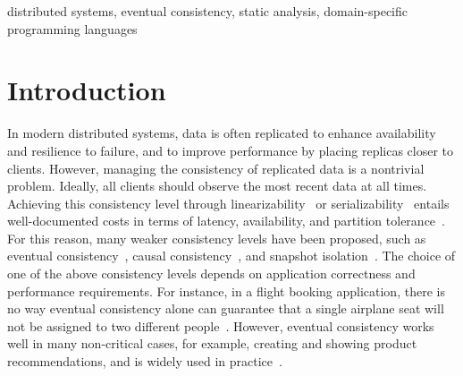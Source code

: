 \documentclass[preprint,numbers]{sigplanconf}
\begin{document}


\keywords
distributed systems, eventual consistency, static analysis, domain-specific programming languages

\section{Introduction}
In modern distributed systems, data is often replicated 
to enhance availability and resilience to failure, and to improve performance by
placing replicas closer to clients. However, managing the consistency of 
replicated data is a nontrivial problem. Ideally, all clients should observe
the most recent data at all times.
Achieving this consistency level through
linearizability~\cite{herlihy1990linearizability} or
serializability~\cite{papadimitriou1979serializability} entails
well-documented costs in terms of latency, availability, and partition
tolerance~\cite{bailis2013highly, kraska2013mdcc}. For this reason,
many weaker consistency levels have been proposed,
such as eventual consistency~\cite{vogels2009eventually}, causal
consistency~\cite{lamport1978time, schiper1989new}, and snapshot isolation~\cite{kemme2000database}.
The choice of one of the above consistency levels depends on application
correctness and performance requirements. For instance, in a flight booking
application, there is no way eventual consistency alone
can guarantee that a single airplane seat will not be assigned to two different
people~\cite{bailis2014coordination, bailis2013highly}. However, eventual
consistency works well
in many non-critical cases, for example, creating and showing product
recommendations, and is widely used in practice~\cite{eventualeBay,eventualNetflix,hastorun2007dynamo}.
\end{document}
